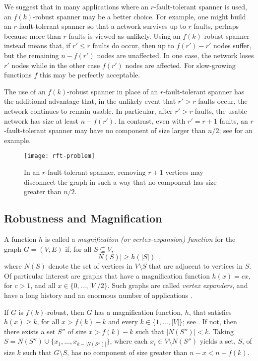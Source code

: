 \documentclass{patmorin}
\begin{document}
We suggest that in many applications where an $r$-fault-tolerant
spanner is used, an $f(k)$-robust spanner may be a better choice.
For example, one might build an $r$-fault-tolerant spanner so that a
network survives up to $r$ faults, perhaps because more than $r$ faults is
viewed as unlikely.  Using an $f(k)$-robust spanner instead means that,
if $r'\le r$ faults do occur, then up to $f(r')-r'$ nodes suffer, but
the remaining $n-f(r')$ nodes are unaffected.  In one case, the network
loses $r'$ nodes while in the other case $f(r')$ nodes are affected.
For slow-growing functions $f$ this may be perfectly acceptable.

The use of an $f(k)$-robust spanner in place of an $r$-fault-tolerant
spanner has the additional advantage that, in the unlikely event that $r'>
r$ faults occur, the network continues to remain usable.  In particular,
after $r'>r$ faults, the usable network has size at least $n-f(r')$. In
contrast, even with $r'=r+1$ faults, an $r$-fault-tolerant spanner may
have no component of size larger than $n/2$; see 
for an example.

\begin{figure}
  \begin{center}
    \texttt{[image: rft-problem]}
  \end{center}
  \caption{In an $r$-fault-tolerant spanner, removing $r+1$ vertices may
  disconnect the graph in such a way that no component has size greater
  than $n/2$.}
\end{figure}

\subsection{Robustness and Magnification}

A function $h$ is called a \emph{magnification
(or vertex-expansion) function} for the graph $G=(V,E)$ if, for all
$S\subseteq V$,
\[
    |N(S)| \ge h(|S|) \enspace ,
\]
where $N(S)$ denote the set of vertices in $V\setminus S$ that are
adjacent to vertices in $S$.  Of particular interest are graphs
that have a magnification function $h(x)=cx$, for $c>1$, and
all $x\in\{0,\ldots,|V|/2\}$.  Such graphs are called \emph{vertex
expanders}, and have a long history and an enormous number of applications
\cite{hlw06}.

If $G$ is $f(k)$-robust, then $G$ has a magnification function,
$h$, that satisfies $h(x) \ge k$, for all $x> f(k)-k$ and every
$k\in\{1,\ldots,|V|\}$; see .  If not, then
there exists a set $S''$ of size $x>f(k)-k$ such that $|N(S'')|<
k$.  Taking $S=N(S'')\cup\{x_1,\ldots,x_{k-|N(S'')|}\}$, where each
$x_i\in V\setminus N(S'')$ yields a set, $S$, of size $k$ such that
$G\setminus S$, has no component of size greater than $n-x < n-f(k)$.
\end{document}
